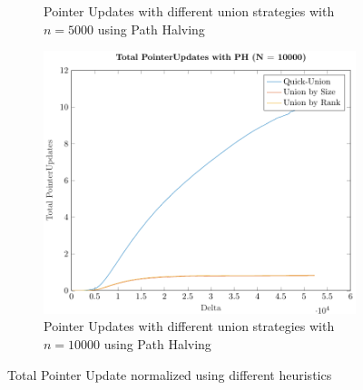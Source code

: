 \begin{figure}[ht]
\begin{subfigure}{0.32\textwidth}
        \caption{Pointer Updates with different union strategies with $n = 5000$ using Path Halving}
    \end{subfigure}%
    \hfill
    \begin{subfigure}{0.32\textwidth}
        \centering
        \includegraphics[width=\textwidth]{../images/plotPHFull10000_PointerUpdates.pdf}
        \caption{Pointer Updates with different union strategies with $n = 10000$ using Path Halving}
    \end{subfigure}

    \caption{Total Pointer Update normalized using different heuristics}
    \label{fig:tpuH}
\end{figure}


